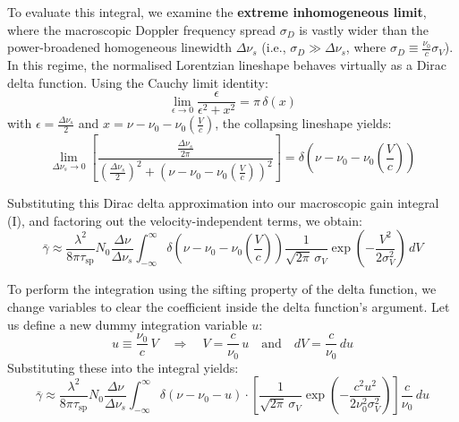 To evaluate this integral, we examine the \textbf{extreme inhomogeneous limit}, where the macroscopic Doppler frequency spread $\sigma_D$ is vastly wider than the power-broadened homogeneous linewidth $\Delta\nu_s$ (i.e., $\sigma_D \gg \Delta\nu_s$, where $\sigma_D \equiv \frac{\nu_0}{c}\sigma_V$). In this regime, the normalised Lorentzian lineshape behaves virtually as a Dirac delta function. Using the Cauchy limit identity:
\begin{equation*}
    \lim_{\epsilon \to 0} \frac{\epsilon}{\epsilon^2 + x^2} = \pi\,\delta(x)
\end{equation*}
with $\epsilon = \frac{\Delta\nu_s}{2}$ and $x = \nu - \nu_0 - \nu_0\left(\frac{V}{c}\right)$, the collapsing lineshape yields:
\begin{equation*}
    \lim_{\Delta\nu_s \to 0} \left[ \frac{\frac{\Delta\nu_s}{2\pi}}{\left(\frac{\Delta\nu_s}{2}\right)^2 + \left(\nu - \nu_0 - \nu_0\left(\frac{V}{c}\right)\right)^2} \right] = \delta\!\left(\nu - \nu_0 - \nu_0\left(\frac{V}{c}\right)\right)
\end{equation*}

Substituting this Dirac delta approximation into our macroscopic gain integral \textup{(I)}, and factoring out the velocity-independent terms, we obtain:
\begin{equation*}
    \bar{\gamma} \approx \frac{\lambda^2}{8\pi\tau_{\mathrm{sp}}} N_0 \frac{\Delta\nu}{\Delta\nu_s} \int_{-\infty}^{\infty} \delta\!\left(\nu - \nu_0 - \nu_0\left(\frac{V}{c}\right)\right) \frac{1}{\sqrt{2\pi}\,\sigma_V} \exp\!\left(-\frac{V^2}{2\sigma_V^2}\right) \, dV
\end{equation*}

To perform the integration using the sifting property of the delta function, we change variables to clear the coefficient inside the delta function's argument. Let us define a new dummy integration variable $u$:
\begin{equation*}
    u \equiv \frac{\nu_0}{c}\,V \quad\Rightarrow\quad V = \frac{c}{\nu_0}\,u \quad\text{and}\quad dV = \frac{c}{\nu_0}\,du
\end{equation*}
Substituting these into the integral yields:
\begin{equation*}
    \bar{\gamma} \approx \frac{\lambda^2}{8\pi\tau_{\mathrm{sp}}} N_0 \frac{\Delta\nu}{\Delta\nu_s} \int_{-\infty}^{\infty} \delta(\nu - \nu_0 - u) \cdot \left[ \frac{1}{\sqrt{2\pi}\,\sigma_V} \exp\!\left(-\frac{c^2 u^2}{2\nu_0^2\sigma_V^2}\right) \right] \frac{c}{\nu_0}\,du
\end{equation*}

